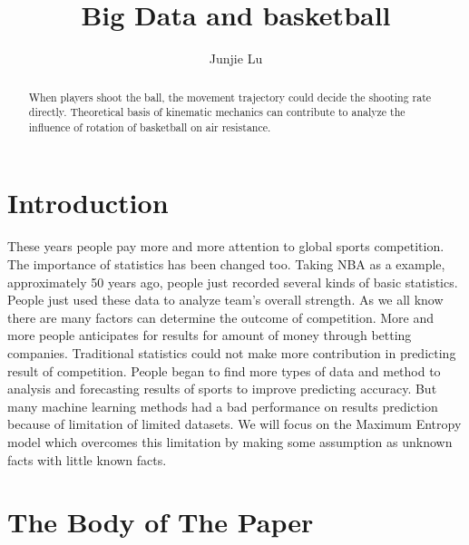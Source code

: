 \documentclass[sigconf]{acmart}
\begin{document}
\title{Big Data and basketball}


\author{Junjie Lu}



\begin{abstract}
When players shoot the ball, the movement trajectory could decide the shooting rate directly. Theoretical basis of kinematic mechanics can contribute to analyze the influence of rotation of basketball on air resistance. 
\end{abstract}



\maketitle

\section{Introduction}
These years people pay more and more attention to global sports competition. The importance of statistics has been changed too. Taking NBA as a example, approximately 50 years ago, people just recorded several kinds of basic statistics. People just used these data to analyze team's overall strength. As we all know there are many factors can determine the outcome of competition. More and more people anticipates for results for amount of money through betting companies. Traditional statistics could not make more contribution in predicting result of competition. People began to find more types of data and method to analysis and forecasting results of sports to improve predicting accuracy. But many machine learning methods had a bad performance on results prediction because of limitation of limited datasets. We will focus on the Maximum Entropy model which overcomes this limitation by making some assumption as unknown facts with little known facts. 
\section{The Body of The Paper}
\end{document}
